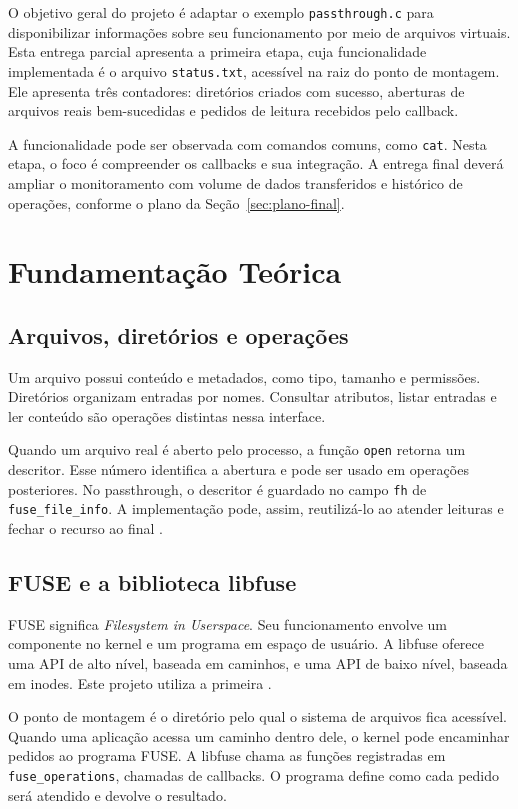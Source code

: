\documentclass[12pt]{article}
\begin{document}
O objetivo geral do projeto é adaptar o exemplo \texttt{passthrough.c}
para disponibilizar informações sobre seu funcionamento por meio de
arquivos virtuais. Esta entrega parcial apresenta a primeira etapa,
cuja funcionalidade implementada é o arquivo
\texttt{status.txt}, acessível na raiz do ponto de montagem. Ele apresenta
três contadores: diretórios criados com sucesso, aberturas de arquivos
reais bem-sucedidas e pedidos de leitura recebidos pelo callback.

A funcionalidade pode ser observada com comandos comuns, como
\texttt{cat}. Nesta etapa, o foco é compreender os callbacks e sua
integração. A entrega final deverá ampliar o monitoramento com volume
de dados transferidos e histórico de operações, conforme o plano da
Seção~\ref{sec:plano-final}.

\section{Fundamentação Teórica}

\subsection{Arquivos, diretórios e operações}

Um arquivo possui conteúdo e metadados, como tipo, tamanho e permissões.
Diretórios organizam entradas por nomes. Consultar atributos, listar
entradas e ler conteúdo são operações distintas nessa interface.

Quando um arquivo real é aberto pelo processo, a função \texttt{open}
retorna um descritor. Esse número identifica a abertura e pode ser usado
em operações posteriores. No passthrough, o descritor é guardado no campo
\texttt{fh} de \texttt{fuse\_file\_info}. A implementação pode, assim,
reutilizá-lo ao atender leituras e fechar o recurso ao final
\cite{passthrough}.

\subsection{FUSE e a biblioteca libfuse}

FUSE significa \textit{Filesystem in Userspace}. Seu funcionamento
envolve um componente no kernel e um programa em espaço de usuário.
A libfuse oferece uma API de alto nível, baseada em caminhos, e uma API
de baixo nível, baseada em inodes. Este projeto utiliza a primeira
\cite{libfuse}.

O ponto de montagem é o diretório pelo qual o sistema de arquivos fica
acessível. Quando uma aplicação acessa um caminho dentro dele, o kernel
pode encaminhar pedidos ao programa FUSE. A libfuse chama as funções
registradas em \texttt{fuse\_operations}, chamadas de callbacks. O programa
define como cada pedido será atendido e devolve o resultado.
\end{document}
